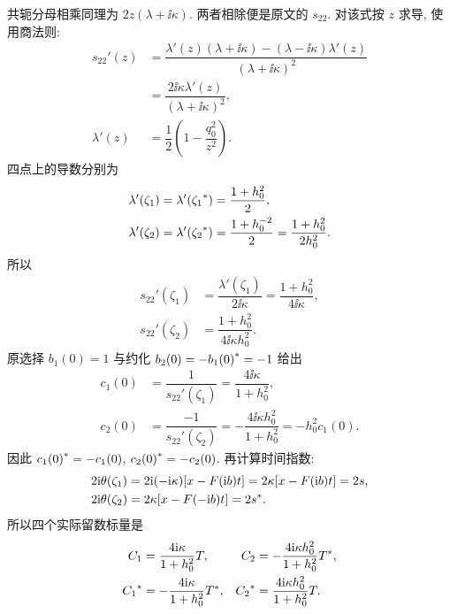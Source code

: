 共轭分母相乘同理为 $2z(\lambda+\ii\kappa)$.
两者相除便是原文的 $s_{22}$.
对该式按 $z$ 求导, 使用商法则:
\begin{equation*}
\begin{aligned}
s_{22}'(z)
&=\dfrac{\lambda'(z)(\lambda+\ii\kappa)
-(\lambda-\ii\kappa)\lambda'(z)}
{(\lambda+\ii\kappa)^2}\\
&=\dfrac{2\ii\kappa\lambda'(z)}
{(\lambda+\ii\kappa)^2},\\
\lambda'(z)&=\dfrac{1}{2}\left(1-\dfrac{q_0^2}{z^2}\right).
\end{aligned}
\end{equation*}
四点上的导数分别为
\begin{equation*}
\begin{aligned}
\lambda'(\zeta_1)=\lambda'({\zeta_1}^{*})
&=\dfrac{1+h_0^2}{2},\\
\lambda'(\zeta_2)=\lambda'({\zeta_2}^{*})
&=\dfrac{1+h_0^{-2}}{2}
=\dfrac{1+h_0^2}{2h_0^2}.
\end{aligned}
\end{equation*}
所以
\begin{equation*}
\begin{aligned}
s_{22}'(\zeta_1)
&=\dfrac{\lambda'(\zeta_1)}{2\ii\kappa}
=\dfrac{1+h_0^2}{4\ii\kappa},\\
s_{22}'(\zeta_2)
&=\dfrac{1+h_0^2}{4\ii\kappa h_0^2}.
\end{aligned}
\end{equation*}
原选择 $b_1(0)=1$ 与约化 $b_2(0)=-{b_1(0)}^{*}=-1$ 给出
\begin{equation*}
\begin{aligned}
c_1(0)&=\dfrac{1}{s_{22}'(\zeta_1)}
=\dfrac{4\ii\kappa}{1+h_0^2},\\
c_2(0)&=\dfrac{-1}{s_{22}'(\zeta_2)}
=-\dfrac{4\ii\kappa h_0^2}{1+h_0^2}
=-h_0^2c_1(0).
\end{aligned}
\end{equation*}
因此 ${c_1(0)}^{*}=-c_1(0)$, ${c_2(0)}^{*}=-c_2(0)$.
再计算时间指数:
\begin{equation*}
\begin{aligned}
2\mathrm{i}\theta(\zeta_1)
&=2\mathrm{i}(-\mathrm{i}\kappa)[x-F(\mathrm{i} b)t]
=2\kappa[x-F(\mathrm{i} b)t]=2s,\\
2\mathrm{i}\theta(\zeta_2)
&=2\kappa[x-F(-\mathrm{i} b)t]=2{s}^{*}.
\end{aligned}
\end{equation*}
所以四个实际留数标量是
\begin{equation*}
\begin{aligned}
C_1&=\dfrac{4\mathrm{i}\kappa}{1+h_0^2}T,&
C_2&=-\dfrac{4\mathrm{i}\kappa h_0^2}{1+h_0^2}{T}^{*},\\
{C_1}^{*}&=-\dfrac{4\mathrm{i}\kappa}{1+h_0^2}{T}^{*},&
{C_2}^{*}&=\dfrac{4\mathrm{i}\kappa h_0^2}{1+h_0^2}T.
\end{aligned}
\end{equation*}

